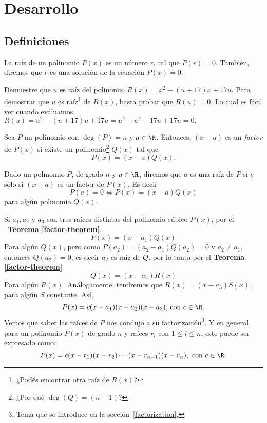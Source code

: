 \section{Desarrollo}\label{sec:desarrollo}

\subsection{Definiciones}
{
    \begin{section-definition}
        La raíz de un polinomio $P(x)$ es un número $r$, tal que $P(r) = 0$. También, diremos que $r$ es una solución de la ecuación $P(x) = 0$.
    \end{section-definition}

    \begin{example}
        Demuestre que $u$ es raíz del polinomio $R(x) = x^2 - (u + 17) x + 17u$.
        \exampleProof
        {
            Para demostrar que $u$ es raíz\footnote{¿Podés encontrar otra raíz de $R(x)$?} de $R(x)$, basta probar que $R(u) = 0$. Lo cual es fácil ver cuando evaluamos $R(u) = u^2 - (u+17)u + 17u = u^2 - u^2 - 17u + 17u = 0.$
        }
    \end{example}


    \begin{section-definition}
        Sea $P$ un polinomio con $\deg{(P)} = n$ y $a \in \R$. Entonces, $(x - a)$ es un \emph{factor} de $P(x)$ si existe un polinomio\footnote{¿Por qué $\deg{(Q)} = (n-1)$?} $Q(x)$ tal que \[P(x) = (x-a)Q(x).\]
    \end{section-definition}

    \begin{theorem}\label{factor-theorem}
        Dado un polinomio $P$, de grado $n$ y $a \in \R$, diremos que $a$ es una raíz de $P$ si y sólo si $(x-a)$ es un factor de $P(x)$. Es decir \[P(a) = 0 \Leftrightarrow P(x) = (x-a)Q(x)\] para algún polinomio $Q(x).$
    \end{theorem}

    Si $a_1, a_2 \mbox{ y } a_3$ son tres raíces distintas del polinomio cúbico $P(x)$, por el ~\textbf{Teorema \ref{factor-theorem}},
    \[P(x) = (x - a_1)Q(x)\]
    Para algún $Q(x)$, pero como $P(a_2) = (a_2 - a_1)Q(a_2) = 0$ y $a_2 \neq a_1$, entonces $Q(a_2) = 0$, es decir $a_2$ es raíz de $Q$, por lo tanto por el \textbf{Teorema \ref{factor-theorem}}
    \[Q(x) = (x - a_2)R(x)\]
    Para algún $R(x)$. Análogamente, tendremos que $R(x) = (x - a_3)S(x)$, para algún $S$ constante. Así,
    \[P(x) = c(x - a_1)(x - a_2)(x - a_3) \mbox{, con } c \in \R.\]
    Vemos que saber las raíces de $P$ nos condujo a su factorización\footnote{Tema que se introduce en la sección~\ref{factorization}.}. Y en general, para un polinomio $P(x)$ de grado $n$ y raíces $r_i \mbox{ con } 1 \leq i \leq n$, este puede ser expresado como:
    \[P(x) = c(x - r_1)(x - r_2)\cdots(x - r_{n-1})(x - r_n), \mbox{ con } c \in \R.\]

}
